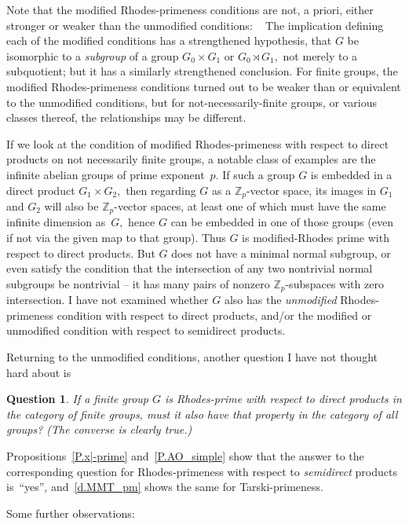 \documentclass{amsart}
\newtheorem{question}[theorem]{Question}
\numberwithin{equation}{section}
\numberwithin{theorem}{section}
\newcommand{\Z}{\mathbb{Z}}
\begin{document}
Note that the modified Rhodes-primeness conditions are
not, a priori, either stronger or weaker than the unmodified
conditions: \ %
The implication defining each of the modified conditions
has a strengthened hypothesis, that $G$ be isomorphic to a
{\em subgroup} of a group $G_0\times G_1$ or $G_0\rtimes G_1,$
not merely to a subquotient;
but it has a similarly strengthened conclusion.
For finite groups, the modified Rhodes-primeness conditions
turned out to be weaker than or equivalent to
the unmodified conditions, but for not-necessarily-finite
groups, or various classes thereof, the relationships
may be different.

If we look at the condition of modified Rhodes-primeness
with respect to direct products on
not necessarily finite groups, a notable class
of examples are the infinite abelian groups of prime exponent~$p.$
If such a group $G$ is embedded in a direct product $G_1\times G_2,$
then regarding $G$ as a $\!\Z_p\!$-vector space,
its images in $G_1$ and $G_2$ will
also be $\!\Z_p\!$-vector spaces, at least one of which must have
the same infinite dimension as~$G,$ hence $G$ can be embedded in
one of those groups (even if not via the given map to that group).
Thus $G$ is modified-Rhodes prime with respect to direct products.
But $G$ does not have a minimal normal subgroup, or even
satisfy the condition that the intersection
of any two nontrivial normal subgroups be nontrivial --
it has many pairs of nonzero $\!\Z_p\!$-subspaces
with zero intersection.
I have not examined whether $G$ also has the {\em unmodified}
Rhodes-primeness condition with respect to direct
products, and/or the modified or unmodified condition with
respect to semidirect products.

Returning to the unmodified conditions,
another question I have not thought hard about is

\begin{question}\label{Q.fin_vs_inf}
If a finite group $G$ is Rhodes-prime with respect to direct products
in the category of finite groups,
must it also have that property in the category of all groups?
{\rm(}The converse is clearly true.{\rm)}
\end{question}

Propositions~\ref{P.x|-prime} and~\ref{P.AO_simple}
show that the answer to the corresponding question for
Rhodes-primeness with respect to {\em semidirect} products
is~``yes'', and~\eqref{d.MMT_pm} shows the same for Tarski-primeness.

Some further observations:
\end{document}
